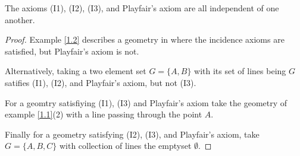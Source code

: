 \begin{proposition}\label{1.1.3}
    The axioms (I1), (I2), (I3), and Playfair's axiom are all independent of one
    another.
\end{proposition}
\begin{proof}
    Example \ref{1.2} describes a geometry in where the incidence axioms are
    satisfied, but Playfair's axiom is not.

    Alternatively, taking a two element set $G=\{A,B\}$ with its set of lines
    being $G$ satifies  (I1), (I2), and Playfair's axiom, but not (I3).

    For a geomtry satisfiying (I1), (I3) and Playfair's axiom take the geometry
    of example \ref{1.1}(2) with a line passing through the point $A$.

    Finally for a geometry satisfying (I2), (I3), and Playfair's axiom, take
    $G=\{A,B,C\}$ with collection of lines the emptyset $\emptyset$.
\end{proof}
